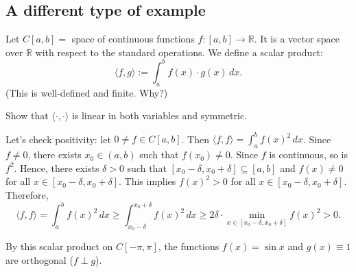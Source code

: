 \subsection*{A different type of example}

Let $C[a,b] =$ space of continuous functions $f: [a,b] \to \mathbb{R}$. It is a vector space over $\mathbb{R}$ with respect to the standard operations. 
We define a scalar product:
\[
    \langle f, g \rangle := \int_a^b f(x) \cdot g(x) \, dx.
\]
(This is well-defined and finite. Why?)

\begin{exercise}
    \label{exc:integral_pairing}
    Show that $\langle \cdot, \cdot \rangle$ is linear in both variables and symmetric.
\end{exercise}

Let's check positivity: let $0 \neq f \in C[a,b]$. Then $\langle f, f \rangle = \int_a^b f(x)^2 \, dx$. Since $f \neq 0$, there exists $x_0 \in (a,b)$ such that $f(x_0) \neq 0$. Since $f$ is continuous, so is $f^2$. Hence, there exists $\delta > 0$ such that $[x_0 - \delta, x_0 + \delta] \subseteq [a,b]$ and $f(x) \neq 0$ for all $x \in [x_0 - \delta, x_0 + \delta]$. This implies $f(x)^2 > 0$ for all $x \in [x_0 - \delta, x_0 + \delta]$. Therefore,
\[
    \langle f, f \rangle = \int_a^b f(x)^2 \, dx \geq \int_{x_0 - \delta}^{x_0 + \delta} f(x)^2 \, dx \geq 2\delta \cdot \min_{x \in [x_0-\delta, x_0+\delta]} f(x)^2 > 0.
\]

\begin{remark}
    By this scalar product on $C[-\pi, \pi]$, the functions $f(x) = \sin x$ and $g(x) \equiv 1$ are orthogonal ($f \perp g$).
\end{remark}

